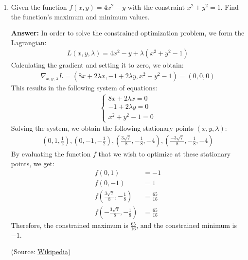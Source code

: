 \documentclass{article}
\newenvironment{QandA}{\begin{enumerate}[label=\arabic*.]}{\end{enumerate}}
\newenvironment{answer}{\par\normalfont \textbf{Answer:}}{}
\begin{document}
\begin{QandA}
    \item Given the function $f(x, y) = 4x^2 - y$ with the constraint $x^2 + y^2 = 1$. Find the function's maximum and minimum values. 
    \begin{answer}
        In order to solve the constrained optimization problem, we form the Lagrangian:
        \begin{align*}
            L(x, y, \lambda) = 4x^2 - y + \lambda(x^2 + y^2 - 1)
        \end{align*}
        Calculating the gradient and setting it to zero, we obtain:
        \begin{align*}
            \nabla_{x, y, \lambda}L = \left( 8x + 2\lambda x, -1 + 2 \lambda y, x^2 + y^2 -1 \right) = (0, 0, 0)
        \end{align*}
        This results in the following system of equations:
        \begin{align*}
            \begin{cases}
                8x + 2\lambda x = 0 \\
                -1 + 2 \lambda y = 0 \\
                x^2 + y^2 - 1 = 0
            \end{cases}
        \end{align*}
        Solving the system, we obtain the following stationary points $(x, y, \lambda)$:
        \begin{align*}
            \left(0, 1, \frac{1}{2} \right), \left(0, -1, -\frac{1}{2} \right),  \left(\frac{3\sqrt{7}}{8}, -\frac{1}{8}, -4 \right),  \left(\frac{-3\sqrt{7}}{8}, -\frac{1}{8}, -4 \right)
        \end{align*}
        By evaluating the function $f$ that we wish to optimize at these stationary points, we get:
        \begin{align*}
            f \left(0, 1\right) &= -1 \\
            f \left(0, -1\right) &= 1 \\
            f \left(\frac{3\sqrt{7}}{8}, -\frac{1}{8}\right) &= \frac{65}{16} \\
            f \left(-\frac{3\sqrt{7}}{8}, -\frac{1}{8}\right) &= \frac{65}{16} 
        \end{align*}
        Therefore, the constrained maximum is $\frac{65}{16}$, and the constrained minimum is $-1$.
        
        (Source: \href{https://en.wikipedia.org/wiki/Lagrange_multiplier}{Wikipedia})
    \end{answer}
\end{QandA}
\end{document}

